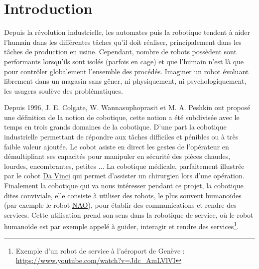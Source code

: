 \setcounter{page}{1}
\section*{Introduction}  \label{sec:introduction}

Depuis la révolution industrielle, les automates puis la robotique tendent à aider l'humain dans les différentes tâches qu'il doit réaliser, principalement dans les tâches de production en usine. Cependant, nombre de robots possèdent sont performants lorsqu'ils sont isolés (parfois en cage) et que l'humain n'est là que pour contrôler globalement l'ensemble des procédés. Imaginer un robot évoluant librement dans un magasin sans gêner, ni physiquement, ni psychologiquement, les usagers soulève des problématiques.

Depuis 1996, J. E. Colgate, W. Wannasuphoprasit et M. A. Peshkin ont proposé une définition de la notion de cobotique, cette notion a été subdivisée avec le temps en trois grands domaines de la cobotique. D'une part la cobotique industrielle permettant de répondre aux tâches difficiles et pénibles ou à très faible valeur ajoutée. Le cobot asiste en direct les gestes de l'opérateur en démultipliant ses capacités pour manipuler en sécurité des pièces chaudes, lourdes, encombrantes, petites ... La cobotique médicale, parfaitement illustrée par le cobot \href{https://fr.wikipedia.org/wiki/Da_Vinci_(chirurgie)}{Da Vinci} qui permet d'assister un chirurgien lors d'une opération. Finalement la cobotique qui va nous intéresser pendant ce projet, la cobotique dites conviviale, elle consiste à utiliser des robots, le plus souvent humanoïdes (par exemple le robot \href{https://fr.wikipedia.org/wiki/NAO_(robotique)}{NAO}), pour établir des communications et rendre des services. Cette utilisation prend son sens dans la robotique de service, où le robot humanoïde est par exemple appelé à guider, interagir et rendre des services\footnote{Exemple d'un robot de service à l'aéroport de Genève : \url{https://www.youtube.com/watch?v=Jdc_AmLVlVI}}.

